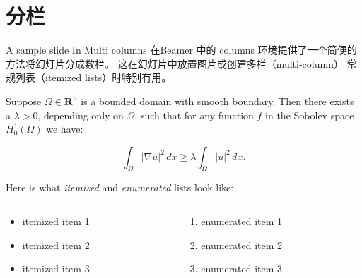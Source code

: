 \documentclass[10pt]{beamer}
\begin{document}
\section{分栏}
\begin{frame}{A sample slide In Multi columns}
\lettrine{在} Beamer 中的 columns 环境提供了一个简便的方法将幻灯片分成数栏。
这在幻灯片中放置图片或创建多栏（multi-column）
常规列表（itemized lists）时特别有用。

    \begin{theorem}
        Suppose $\Omega\in\mathbf{R}^n$ is a bounded domain with smooth
        boundary.  Then there exists a $\lambda>0$, depending only on
        $\Omega$, such that for any function $f$ in the Sobolev space
        $H^1_0(\Omega)$ we have:
        
        \[
        \int_\Omega |\nabla u|^2 \,dx \ge 
        \lambda \int_\Omega |u|^2 \,dx .
        \]
    \end{theorem}
    Here is what \emph{itemized} and \emph{enumerated} lists look like:
    \begin{columns}
      \begin{column}{0.45\textwidth}
      \begin{itemize}
        \item itemized item 1
        \item itemized item 2
        \item itemized item 3
      \end{itemize}
      \end{column}
    
      \begin{column}{0.45\textwidth}
      \begin{enumerate}
        \item enumerated item 1
        \item enumerated item 2
        \item enumerated item 3
      \end{enumerate}
      \end{column}
    \end{columns}
\end{frame}


\end{document}
